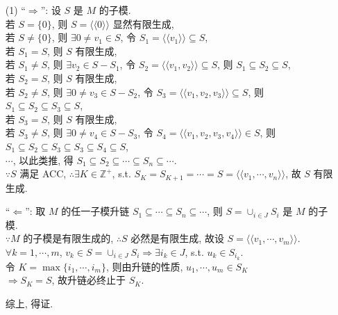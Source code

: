 \documentclass{note}
\begin{document}
\begin{pf}
    \begin{itemize}
        \item[(1)] ``$\Longrightarrow$'': 设 $S$ 是 $M$ 的子模.\\
        若 $S=\{0\}$, 则 $S=\langle\langle 0\rangle\rangle$ 显然有限生成,\\
        若 $S\neq\{0\}$, 则 $\exists 0\neq v_1\in S$, 令 $S_1=\langle\langle v_1\rangle\rangle\subseteq S$,\\
        若 $S_1=S$, 则 $S$ 有限生成,\\
        若 $S_1\neq S$, 则 $\exists v_2\in S-S_1$, 令 $S_2=\langle\langle v_1,v_2\rangle\rangle\subseteq S$, 则 $S_1\subseteq S_2\subseteq S$,\\
        若 $S_2=S$, 则 $S$ 有限生成,\\
        若 $S_2\neq S$, 则 $\exists 0\neq v_3\in S-S_2$, 令 $S_3=\langle\langle v_1,v_2,v_3\rangle\rangle\subseteq S$, 则 $S_1\subseteq S_2\subseteq S_3\subseteq S$,\\
        若 $S_3=S$, 则 $S$ 有限生成,\\
        若 $S_3\neq S$, 则 $\exists 0\neq v_4\in S-S_3$, 令 $S_4=\langle\langle v_1,v_2,v_3,v_4\rangle\rangle\in S$, 则 $S_1\subseteq S_2\subseteq S_3\subseteq S_3\subseteq S_4\subseteq S$,\\
        $\cdots$, 以此类推, 得 $S_1\subseteq S_2\subseteq\cdots\subseteq S_n\subseteq\cdots$.\\
        $\because S$ 满足 ACC, $\therefore\exists K\in\mathbb{Z}^+$, s.t. $S_K=S_{K+1}=\cdots=S=\langle\langle v_1,\cdots,v_n\rangle\rangle$, 故 $S$ 有限生成.

        ``$\Longleftarrow$'': 取 $M$ 的任一子模升链 $S_1\subseteq\cdots\subseteq S_n\subseteq\cdots$, 则 $S=\cup_{i\in J}S_i$ 是 $M$ 的子模.\\
        $\because M$ 的子模是有限生成的, $\therefore S$ 必然是有限生成, 故设 $S=\langle\langle v_1,\cdots,v_m\rangle\rangle$.\\
        $\forall k=1,\cdots,m$, $v_k\in S=\cup_{i\in J}S_i\Longrightarrow\exists i_k\in J$, s.t. $u_k\in S_{i_k}$.\\
        令 $K=\max\{i_1,\cdots,i_m\}$, 则由升链的性质, $u_1,\cdots,u_m\in S_K$\\
        $\Longrightarrow S_K=S$, 故升链必终止于 $S_K$.

        综上, 得证.
    \end{itemize}
\end{pf}
\end{document}
